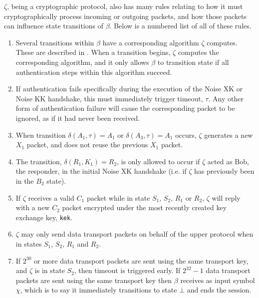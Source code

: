 \documentclass{article}
\begin{document}
\begin{definition}
	$\zeta$, being a cryptographic protocol, also has many rules relating to how it must cryptographically process incoming or outgoing packets, and how those packets can influence state transitions of $\beta$. Below is a numbered list of all of these rules.
	\begin{enumerate}
		\item Several transitions within $\beta$ have a corresponding algorithm $\zeta$ computes. These are described in . When a transition begins, $\zeta$ computes the corresponding algorithm, and it only allows $\beta$ to transition state if all authentication steps within this algorithm succeed.
		\item If authentication fails specifically during the execution of the Noise XK or Noise KK handshake, this must immediately trigger timeout, $\tau$. Any other form of authentication failure will cause the corresponding packet to be ignored, as if it had never been received.
		\item When transition $\delta(A_1, \tau)=A_1$ or $\delta(A_3, \tau)=A_1$ occurs, $\zeta$ generates a new $X_1$ packet, and does not reuse the previous $X_1$ packet.
		\item The transition, $\delta(R_1, K_1)=R_2$, is only allowed to occur if $\zeta$ acted as Bob, the responder, in the initial Noise XK handshake (i.e. if $\zeta$ has previously been in the $B_2$ state).
		\item If $\zeta$ receives a valid $C_1$ packet while in state $S_1$, $S_2$, $R_1$ or $R_2$, $\zeta$ will reply with a new $C_2$ packet encrypted under the most recently created key exchange key, \texttt{kek}.
		\item $\zeta$ may only send data transport packets on behalf of the upper protocol when in states $S_1$, $S_2$, $R_1$ and $R_2$.
		\item If $2^{30}$ or more data transport packets are sent using the same transport key, and $\zeta$ is in state $S_2$, then timeout is triggered early. If $2^{32} - 1$ data transport packets are sent using the same transport key then $\beta$ receives as input symbol $\chi$, which is to say it immediately transitions to state $\bot$ and ends the session.
	\end{enumerate}
\end{definition}
\end{document}
